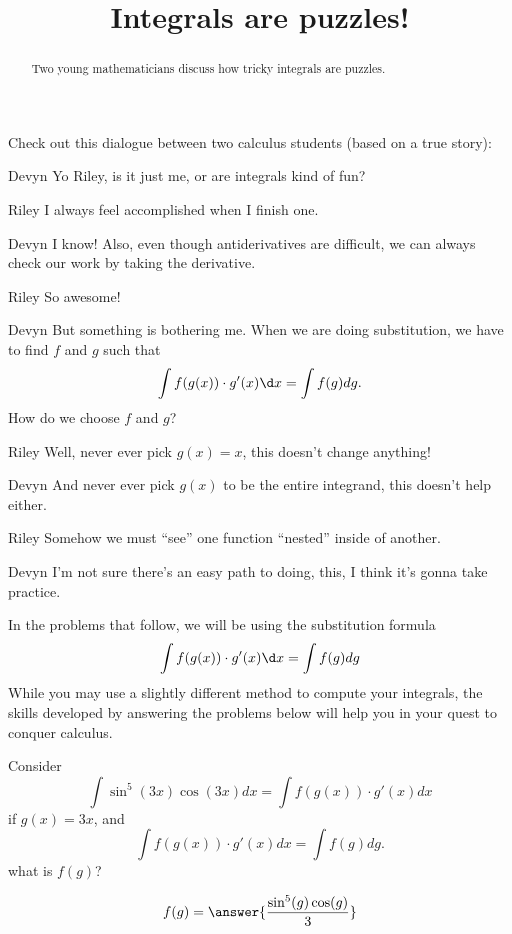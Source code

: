 \documentclass{ximera}
\title[Break-Ground:]{Integrals are puzzles!}
\begin{document}
\begin{abstract}
Two young mathematicians discuss how tricky integrals are puzzles.
\end{abstract}
\maketitle

Check out this dialogue between two calculus students (based on a true
story):

\begin{dialogue}
\item[Devyn] Yo Riley, is it just me, or are integrals kind of fun?
\item[Riley] I always feel accomplished when I finish one.
\item[Devyn] I know! Also, even though antiderivatives are difficult,
  we can always check our work by taking the derivative.
\item[Riley] So awesome!
\item[Devyn] But something is bothering me. When we are doing substitution,
  we have to find $f$ and $g$ such that
  \[
  \int f(g(x)) \cdot g'(x) \d x = \int f(g) dg.
  \]
  How do we choose $f$ and $g$?
\item[Riley] Well, never ever pick $g(x) = x$, this doesn't change
    anything!
\item[Devyn] And never ever pick $g(x)$ to be the entire integrand,
  this doesn't help either.
\item[Riley] Somehow we must ``see'' one function ``nested'' inside of
  another.
\item[Devyn] I'm not sure there's an easy path to doing, this, I think
  it's gonna take practice.
\end{dialogue}


In the problems that follow, we will be using the substitution formula
\[
   \int f(g(x)) \cdot g'(x) \d x = \int f(g) dg
\]
While you may use a slightly different method to compute your
integrals, the skills developed by answering the problems below will
help you in your quest to conquer calculus.

\begin{problem}
  Consider
  \[
  \int \sin^5(3x) \cos(3x) dx = \int f(g(x)) \cdot g'(x) dx
  \]
  if $g(x) = 3x$, and 
  \[
  \int f(g(x)) \cdot g'(x) dx = \int f(g) dg.
  \]
  what is $f(g)$?
  \begin{prompt}
    \[
    f(g) = \answer{
      \frac{\sin^5(g) \cos(g)}{3}}
    \]
  \end{prompt}
\end{problem}
\end{document}
